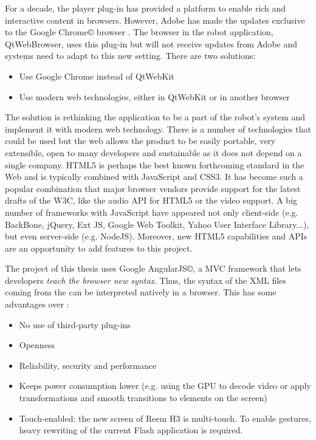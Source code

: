 For a decade, the \flash player plug-in has provided a platform to enable rich and interactive content in browsers.
However, Adobe has made the updates exclusive to the Google Chrome\copyright \xspace browser \cite{FlashRoadmap}. 
The browser in the robot application, QtWebBrowser, uses this plug-in but will not receive updates from Adobe and \company systems need to adapt to this new setting. 
There are two solutions:
\begin{itemize}
	\item Use Google Chrome instead of QtWebKit
	\item Use modern web technologies, either in QtWebKit or in another browser
\end{itemize}

The solution is rethinking the application to be a part of the robot's system and implement it with modern web technology.
There is a number of technologies that could be used but the web allows the product to be easily portable, very extensible, open to many developers and sustainable as it does not depend on a single company.
\ac{HTML5} is perhaps the best known forthcoming standard in the Web and is typically combined with JavaScript and \ac{CSS3}. 
It has become such a popular combination that major browser vendors provide support for the latest drafts of the \ac{W3C}, like the audio \ac{API} for \ac{HTML5} or the video support.
A big number of frameworks with JavaScript have appeared not only client-side (e.g. BackBone, jQuery, Ext JS, Google Web Toolkit, Yahoo User Interface Library...), but even server-side (e.g. NodeJS).
Moreover, new \ac{HTML5} capabilities and \acp{API} are an opportunity to add features to this project.

The project of this thesis uses Google AngularJS\copyright, a \ac{MVC} framework that lets developers \emph{teach the browser new syntax}. 
Thus, the syntax of the \ac{XML} files coming from the \se can be interpreted natively in a browser. 
This has some advantages over \flash \cite{Jobs:ThoughtsOnFlash}:
\begin{itemize}
    \item No use of third-party plug-ins
    \item Openness
    \item Reliability, security and performance
    \item Keeps power consumption lower (e.g. using the GPU to decode video or apply transformations and smooth transitions to elements on the screen)
    \item Touch-enabled: the new screen of Reem H3 is multi-touch. To enable gestures, heavy rewriting of the current Flash application is required.
\end{itemize}

